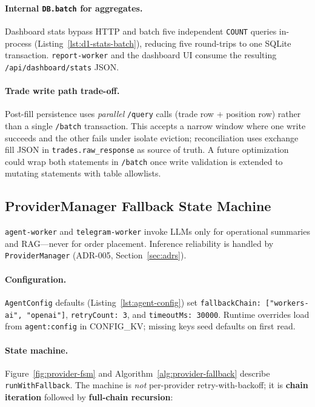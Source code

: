 
\paragraph{Internal \texttt{DB.batch} for aggregates.} Dashboard stats bypass HTTP and batch five independent \texttt{COUNT} queries in-process (Listing~\ref{lst:d1-stats-batch}), reducing five round-trips to one SQLite transaction. \texttt{report-worker} and the dashboard UI consume the resulting \texttt{/api/dashboard/stats} JSON.


\paragraph{Trade write path trade-off.} Post-fill persistence uses \emph{parallel} \texttt{/query} calls (trade row + position row) rather than a single \texttt{/batch} transaction. This accepts a narrow window where one write succeeds and the other fails under isolate eviction; reconciliation uses exchange fill JSON in \texttt{trades.raw\_response} as source of truth. A future optimization could wrap both statements in \texttt{/batch} once write validation is extended to mutating statements with table allowlists.

\subsection{ProviderManager Fallback State Machine}

\texttt{agent-worker} and \texttt{telegram-worker} invoke LLMs only for operational summaries and RAG---never for order placement. Inference reliability is handled by \texttt{ProviderManager} (ADR-005, Section~\ref{sec:adrs}).

\paragraph{Configuration.} \texttt{AgentConfig} defaults (Listing~\ref{lst:agent-config}) set \texttt{fallbackChain: ["workers-ai", "openai"]}, \texttt{retryCount: 3}, and \texttt{timeoutMs: 30000}. Runtime overrides load from \texttt{agent:config} in CONFIG\_KV; missing keys seed defaults on first read.

\paragraph{State machine.} Figure~\ref{fig:provider-fsm} and Algorithm~\ref{alg:provider-fallback} describe \texttt{runWithFallback}. The machine is \emph{not} per-provider retry-with-backoff; it is \textbf{chain iteration} followed by \textbf{full-chain recursion}:

